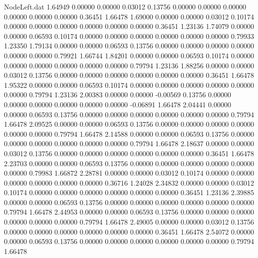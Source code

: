 \begin{filecontents}{NodeLeft.dat}
   1.64949    0.00000    0.00000     0.03012    0.13756    0.00000    0.00000    0.00000    0.00000    0.00000    0.00000    0.36451    1.66478
   1.69000    0.00000    0.00000     0.03012    0.10174    0.00000    0.00000    0.00000    0.00000    0.00000    0.00000    0.36451    1.23136
   1.74079    0.00000    0.00000     0.06593    0.10174    0.00000    0.00000    0.00000    0.00000    0.00000    0.00000    0.79933    1.23350
   1.79134    0.00000    0.00000     0.06593    0.13756    0.00000    0.00000    0.00000    0.00000    0.00000    0.00000    0.79921    1.66744
   1.84201    0.00000    0.00000     0.06593    0.10174    0.00000    0.00000    0.00000    0.00000    0.00000    0.00000    0.79794    1.23136
   1.88256    0.00000    0.00000     0.03012    0.13756    0.00000    0.00000    0.00000    0.00000    0.00000    0.00000    0.36451    1.66478
   1.95322    0.00000    0.00000     0.06593    0.10174    0.00000    0.00000    0.00000    0.00000    0.00000    0.00000    0.79794    1.23136
   2.00383    0.00000    0.00000    -0.00569    0.13756    0.00000    0.00000    0.00000    0.00000    0.00000    0.00000   -0.06891    1.66478
   2.04441    0.00000    0.00000     0.06593    0.13756    0.00000    0.00000    0.00000    0.00000    0.00000    0.00000    0.79794    1.66478
   2.09525    0.00000    0.00000     0.06593    0.13756    0.00000    0.00000    0.00000    0.00000    0.00000    0.00000    0.79794    1.66478
   2.14588    0.00000    0.00000     0.06593    0.13756    0.00000    0.00000    0.00000    0.00000    0.00000    0.00000    0.79794    1.66478
   2.18637    0.00000    0.00000     0.03012    0.13756    0.00000    0.00000    0.00000    0.00000    0.00000    0.00000    0.36451    1.66478
   2.23703    0.00000    0.00000     0.06593    0.13756    0.00000    0.00000    0.00000    0.00000    0.00000    0.00000    0.79983    1.66872
   2.28781    0.00000    0.00000     0.03012    0.10174    0.00000    0.00000    0.00000    0.00000    0.00000    0.00000    0.36716    1.24028
   2.34832    0.00000    0.00000     0.03012    0.10174    0.00000    0.00000    0.00000    0.00000    0.00000    0.00000    0.36451    1.23136
   2.39885    0.00000    0.00000     0.06593    0.13756    0.00000    0.00000    0.00000    0.00000    0.00000    0.00000    0.79794    1.66478
   2.44953    0.00000    0.00000     0.06593    0.13756    0.00000    0.00000    0.00000    0.00000    0.00000    0.00000    0.79794    1.66478
   2.49005    0.00000    0.00000     0.03012    0.13756    0.00000    0.00000    0.00000    0.00000    0.00000    0.00000    0.36451    1.66478
   2.54072    0.00000    0.00000     0.06593    0.13756    0.00000    0.00000    0.00000    0.00000    0.00000    0.00000    0.79794    1.66478

\end{filecontents}
